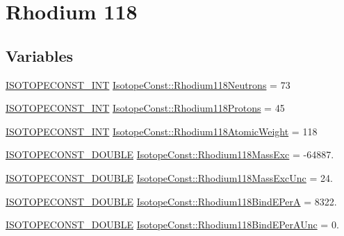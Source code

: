 \hypertarget{group___isotope_const-_rhodium-_rh118}{}\section{Rhodium 118}
\label{group___isotope_const-_rhodium-_rh118}
\subsection*{Variables}
\begin{DoxyCompactItemize}
\item 
\mbox{\hyperlink{group___isotope_const-_macros_ga5f18360b3e99483a35c32d789e62621c}{I\+S\+O\+T\+O\+P\+E\+C\+O\+N\+S\+T\+\_\+\+I\+NT}} \mbox{\hyperlink{group___isotope_const-_rhodium-_rh118_ga0817d824188f36ecde53700ecb2e71bb}{Isotope\+Const\+::\+Rhodium118\+Neutrons}} = 73
\item 
\mbox{\hyperlink{group___isotope_const-_macros_ga5f18360b3e99483a35c32d789e62621c}{I\+S\+O\+T\+O\+P\+E\+C\+O\+N\+S\+T\+\_\+\+I\+NT}} \mbox{\hyperlink{group___isotope_const-_rhodium-_rh118_ga9a437250d830b4f2604fec098b66b097}{Isotope\+Const\+::\+Rhodium118\+Protons}} = 45
\item 
\mbox{\hyperlink{group___isotope_const-_macros_ga5f18360b3e99483a35c32d789e62621c}{I\+S\+O\+T\+O\+P\+E\+C\+O\+N\+S\+T\+\_\+\+I\+NT}} \mbox{\hyperlink{group___isotope_const-_rhodium-_rh118_ga3529481c2bf82ab09589bfefac8fa586}{Isotope\+Const\+::\+Rhodium118\+Atomic\+Weight}} = 118
\item 
\mbox{\hyperlink{group___isotope_const-_macros_ga8f45a7272ce02c0b4c65c44636ed719a}{I\+S\+O\+T\+O\+P\+E\+C\+O\+N\+S\+T\+\_\+\+D\+O\+U\+B\+LE}} \mbox{\hyperlink{group___isotope_const-_rhodium-_rh118_gae13e06ec27b698b687de865f71b60da0}{Isotope\+Const\+::\+Rhodium118\+Mass\+Exc}} = -\/64887.
\item 
\mbox{\hyperlink{group___isotope_const-_macros_ga8f45a7272ce02c0b4c65c44636ed719a}{I\+S\+O\+T\+O\+P\+E\+C\+O\+N\+S\+T\+\_\+\+D\+O\+U\+B\+LE}} \mbox{\hyperlink{group___isotope_const-_rhodium-_rh118_ga82ac05f3f306dcab53e19667af0b3df8}{Isotope\+Const\+::\+Rhodium118\+Mass\+Exc\+Unc}} = 24.
\item 
\mbox{\hyperlink{group___isotope_const-_macros_ga8f45a7272ce02c0b4c65c44636ed719a}{I\+S\+O\+T\+O\+P\+E\+C\+O\+N\+S\+T\+\_\+\+D\+O\+U\+B\+LE}} \mbox{\hyperlink{group___isotope_const-_rhodium-_rh118_gaf89e680dc65f2feac32ecb379f105ac4}{Isotope\+Const\+::\+Rhodium118\+Bind\+E\+PerA}} = 8322.
\item 
\mbox{\hyperlink{group___isotope_const-_macros_ga8f45a7272ce02c0b4c65c44636ed719a}{I\+S\+O\+T\+O\+P\+E\+C\+O\+N\+S\+T\+\_\+\+D\+O\+U\+B\+LE}} \mbox{\hyperlink{group___isotope_const-_rhodium-_rh118_ga9dfd658c58258dc94f56cfdbe9031831}{Isotope\+Const\+::\+Rhodium118\+Bind\+E\+Per\+A\+Unc}} = 0.

\end{DoxyCompactItemize}
